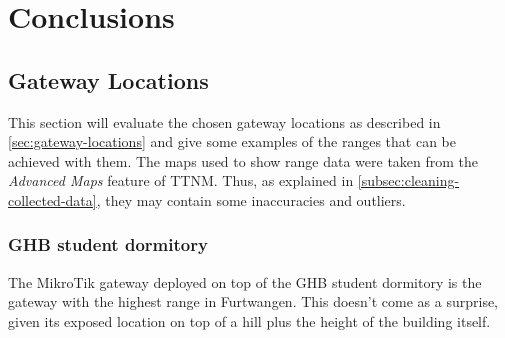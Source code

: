 \chapter{Conclusions}

\section{Gateway Locations}\label{sec:gateway-locations-conclusions}

This section will evaluate the chosen gateway locations as described in \cref{sec:gateway-locations} and give some examples of the ranges that can be achieved with them.
The maps used to show range data were taken from the \emph{Advanced Maps} feature of \ac{TTNM}.
Thus, as explained in \cref{subsec:cleaning-collected-data}, they may contain some inaccuracies and outliers.

\subsection{\acf{GHB} student dormitory}\label{subsec:ghb-student-dormitory-range-results}

The MikroTik gateway deployed on top of the \ac{GHB} student dormitory is the gateway with the highest range in Furtwangen.
This doesn't come as a surprise, given its exposed location on top of a hill plus the height of the building itself.

